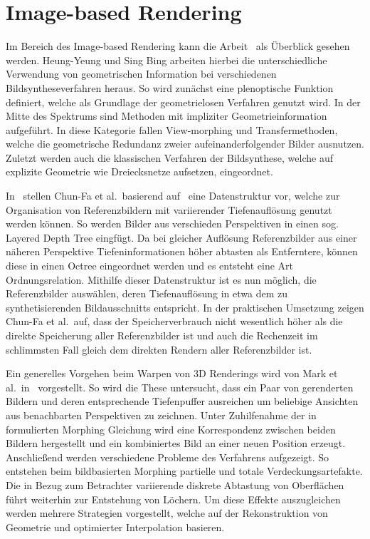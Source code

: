 \documentclass[hyperref, beleg, german]{cgvpub}
\begin{document}
\section{Image-based Rendering}

Im Bereich des Image-based Rendering kann die Arbeit~\cite{shum2000review} als
Überblick gesehen werden. Heung-Yeung und Sing Bing arbeiten hierbei die
unterschiedliche Verwendung von geometrischen Information bei verschiedenen
Bildsyntheseverfahren heraus. So wird zunächst eine plenoptische Funktion
definiert, welche als Grundlage der geometrielosen Verfahren genutzt wird. In
der Mitte des Spektrums sind Methoden mit impliziter Geometrieinformation
aufgeführt. In diese Kategorie fallen View-morphing und Transfermethoden, welche
die geometrische Redundanz zweier aufeinanderfolgender Bilder ausnutzen. Zuletzt
werden auch die klassischen Verfahren der Bildsynthese, welche auf explizite
Geometrie wie Dreiecksnetze aufsetzen, eingeordnet.

In~\cite{chang1999ldi} stellen Chun-Fa et al.\ basierend auf~\cite{he1998layered}
eine Datenstruktur vor, welche zur Organisation von Referenzbildern mit
variierender Tiefenauflösung genutzt werden können. So werden Bilder aus
verschieden Perspektiven in einen sog. Layered Depth Tree eingfügt. Da bei
gleicher Auflösung Referenzbilder aus einer näheren Perspektive
Tiefeninformationen höher abtasten als Entferntere, können diese in einen Octree
eingeordnet werden und es entsteht eine Art Ordnungsrelation. Mithilfe dieser
Datenstruktur ist es nun möglich, die Referenzbilder auswählen, deren
Tiefenauflösung in etwa dem zu synthetisierenden Bildausschnitts entspricht. In
der praktischen Umsetzung zeigen Chun-Fa et al.\ auf, dass der Speicherverbrauch
nicht wesentlich höher als die direkte Speicherung aller Referenzbilder ist und
auch die Rechenzeit im schlimmsten Fall gleich dem direkten Rendern aller
Referenzbilder ist.

Ein generelles Vorgehen beim Warpen von 3D Renderings wird von Mark et al.\
in~\cite{mark1997post} vorgestellt. So wird die These untersucht, dass ein Paar
von gerenderten Bildern und deren entsprechende Tiefenpuffer ausreichen um
beliebige Ansichten aus benachbarten Perspektiven zu zeichnen. Unter
Zuhilfenahme der in~\cite{mcmillan1995head} formulierten Morphing Gleichung
wird eine Korrespondenz zwischen beiden Bildern hergestellt und ein
kombiniertes Bild an einer neuen Position erzeugt. Anschließend werden
verschiedene Probleme des Verfahrens aufgezeigt. So entstehen beim
bildbasierten Morphing partielle und totale Verdeckungsartefakte. Die in Bezug
zum Betrachter variierende diskrete Abtastung von Oberflächen führt weiterhin
zur Entstehung von Löchern. Um diese Effekte auszugleichen werden mehrere
Strategien vorgestellt, welche auf der Rekonstruktion von Geometrie und
optimierter Interpolation basieren.
\end{document}
